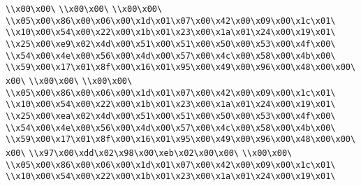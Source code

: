 \verb|\\x00\x00\|\newline
\verb|\\x00\x00\|\newline
\verb|\\x00\x00\|\newline
\verb|\\x05\x00\x86\x00\x06\x00\x1d\x01\x07\x00\x42\x00\x09\x00\x1c\x01\|\newline
\verb|\\x10\x00\x54\x00\x22\x00\x1b\x01\x23\x00\x1a\x01\x24\x00\x19\x01\|\newline
\verb|\\x25\x00\xe9\x02\x4d\x00\x51\x00\x51\x00\x50\x00\x53\x00\x4f\x00\|\newline
\verb|\\x54\x00\x4e\x00\x56\x00\x4d\x00\x57\x00\x4c\x00\x58\x00\x4b\x00\|\newline
\verb|\\x59\x00\x17\x01\x8f\x00\x16\x01\x95\x00\x49\x00\x96\x00\x48\x00\x00\x00\|\newline
\verb|\\x00\x00\|\newline
\verb|\\x00\x00\|\newline
\verb|\\x05\x00\x86\x00\x06\x00\x1d\x01\x07\x00\x42\x00\x09\x00\x1c\x01\|\newline
\verb|\\x10\x00\x54\x00\x22\x00\x1b\x01\x23\x00\x1a\x01\x24\x00\x19\x01\|\newline
\verb|\\x25\x00\xea\x02\x4d\x00\x51\x00\x51\x00\x50\x00\x53\x00\x4f\x00\|\newline
\verb|\\x54\x00\x4e\x00\x56\x00\x4d\x00\x57\x00\x4c\x00\x58\x00\x4b\x00\|\newline
\verb|\\x59\x00\x17\x01\x8f\x00\x16\x01\x95\x00\x49\x00\x96\x00\x48\x00\x00\x00\|\newline
\verb|\\x97\x00\xdd\x02\x98\x00\xeb\x02\x00\x00\|\newline
\verb|\\x00\x00\|\newline
\verb|\\x05\x00\x86\x00\x06\x00\x1d\x01\x07\x00\x42\x00\x09\x00\x1c\x01\|\newline
\verb|\\x10\x00\x54\x00\x22\x00\x1b\x01\x23\x00\x1a\x01\x24\x00\x19\x01\|\newline
